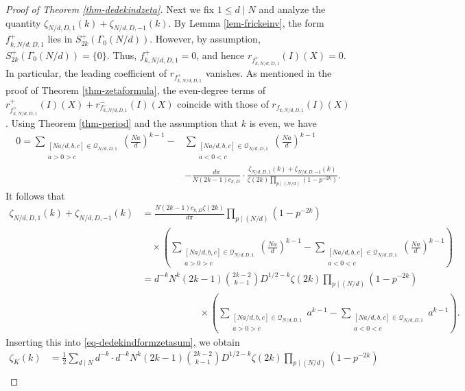 \documentclass[12pt]{amsart}
\numberwithin{equation}{section}
\theoremstyle{definition}
\begin{document}
\begin{proof}[Proof of Theorem \ref{thm-dedekindzeta}]
Next we fix $1\leq d\mid N$ and analyze the quantity $\zeta_{N/d,D,1}(k)+\zeta_{N/d,D,-1}(k)$. By Lemma \ref{lem-frickeinv}, the form $f_{k,N/d,D,1}^{+}$ lies in $S_{2k}^{+}(\Gamma_{0}(N/d))$. However, by assumption, $S_{2k}^{+}(\Gamma_{0}(N/d))=\{0\}$. Thus, $f_{k,N/d,D,1}^{+}=0$, and hence $r_{f_{k,N/d,D,1}^{+}}(I)(X)=0$. In particular, the leading coefficient of $r_{f_{k,N/d,D,1}^{+}}$ vanishes. As mentioned in the proof of Theorem \ref{thm-zetaformula}, the even-degree terms of $r_{f_{k,N/d,D,1}^{+}}^{+}(I)(X)+r_{f_{k,N/d,D,1}^{-}}^{-}(I)(X)$ coincide with those of $r_{f_{k,N/d,D,1}}(I)(X)$. Using Theorem \ref{thm-period} and the assumption that $k$ is even, we have
\begin{equation*}
    \begin{split}
        0=\sum\limits_{\substack{[Na/d,b,c]\in\mathcal{Q}_{N/d,D,1} \\ a>0>c}}\left(\frac{Na}{d}\right)^{k-1}-&\sum\limits_{\substack{[Na/d,b,c]\in\mathcal{Q}_{N/d,D,1} \\ a<0<c}}\left(\frac{Na}{d}\right)^{k-1}\\
        &-\frac{d\pi}{N(2k-1)c_{k,D}}\cdot\frac{\zeta_{N/d,D,1}(k)+\zeta_{N/d,D,-1}(k)}{\zeta(2k)\prod_{p\mid (N/d)}(1-p^{-2k})}.
    \end{split}
\end{equation*}
It follows that
\begin{align*}
    \zeta_{N/d,D,1}(k)+\zeta_{N/d,D,-1}(k)
    &=\frac{N(2k-1)c_{k,D}\zeta(2k)}{d\pi}\prod_{p\mid (N/d)}(1-p^{-2k})\\
    &\quad\times\left(\sum\limits_{\substack{[Na/d,b,c]\in\mathcal{Q}_{N/d,D,1} \\ a>0>c}}\left(\frac{Na}{d}\right)^{k-1}-\sum\limits_{\substack{[Na/d,b,c]\in\mathcal{Q}_{N/d,D,1} \\ a<0<c}}\left(\frac{Na}{d}\right)^{k-1}\right)\\
    &=d^{-k}N^{k}(2k-1)\binom{2k-2}{k-1}D^{1/2-k}\zeta(2k)\prod_{p\mid(N/d)}(1-p^{-2k})\\
    &\qquad\qquad\qquad\times\left(\sum\limits_{\substack{[Na/d,b,c]\in\mathcal{Q}_{N/d,D,1} \\ a>0>c}}a^{k-1}-\sum\limits_{\substack{[Na/d,b,c]\in\mathcal{Q}_{N/d,D,1} \\ a<0<c}}a^{k-1}\right).
\end{align*}
Inserting this into \eqref{eq-dedekindformzetasum}, we obtain
\begin{align*}
    \zeta_{K}(k)
    &=\frac{1}{2}\sum_{d\mid N}d^{-k}\cdot d^{-k}N^{k}(2k-1)\binom{2k-2}{k-1}D^{1/2-k}\zeta(2k)\prod_{p\mid(N/d)}(1-p^{-2k})\\

\end{align*}
\end{proof}
\end{document}
